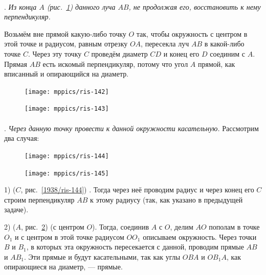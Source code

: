 \documentclass[oneside]{book}
\begin{document}
\paragraph{}\label{1938/127}
.
\emph{Из конца $A$ \emph{(рис.~\ref{1938/ris-143})} данного луча $AB$, не продолжая его, восстановить к нему перпендикуляр.}

Возьмём вне прямой какую-либо точку $O$ так, чтобы окружность с центром в этой точке и радиусом, равным отрезку $OA$, пересекла луч $AB$ в какой-либо точке $C$.
Через эту точку $C$ проведём диаметр $CD$ и конец его $D$ соединим с $A$.
Прямая $AB$ есть искомый перпендикуляр, потому что угол $A$ прямой, как вписанный и опирающийся на диаметр.

\begin{figure}[h]
\begin{minipage}{.48\textwidth}
\centering
\texttt{[image: mppics/ris-142]}
\caption{}\label{1938/ris-142}
\end{minipage}
\hfill
\begin{minipage}{.48\textwidth}
\centering
\texttt{[image: mppics/ris-143]}
\caption{}\label{1938/ris-143}
\end{minipage}
\end{figure}

\paragraph{}\label{1938/128}
.
\emph{Через данную точку провести к данной окружности касательную.}
Рассмотрим два случая:

\begin{figure}[h]
\begin{minipage}{.48\textwidth}
\centering
\texttt{[image: mppics/ris-144]}
\caption{}\label{1938/ris-144}
\end{minipage}
\hfill
\begin{minipage}{.48\textwidth}
\centering
\texttt{[image: mppics/ris-145]}
\caption{}\label{1938/ris-145}
\end{minipage}
\end{figure}

1)  ($C$, рис.~\ref{1938/ris-144}) .
Тогда через неё проводим радиус и через конец его $C$ строим перпендикуляр $AB$ к этому радиусу (так, как указано в предыдущей задаче).

2)  ($A$, рис.~\ref{1938/ris-145})  (с центром $O$).
Тогда, соединив $A$ с $O$, делим $AO$ пополам в точке $O_1$ и с центром в этой точке радиусом $OO_1$ описываем окружность.
Через точки $B$ и $B_1$, в которых эта окружность пересекается с данной, проводим прямые $AB$ и $AB_1$.
Эти прямые и будут касательными, так как углы $OBA$ и $OB_1A$, как опирающиеся на диаметр, — прямые.
\end{document}
